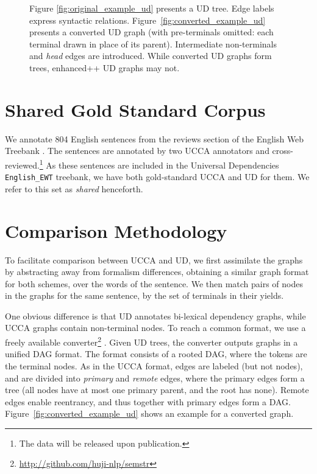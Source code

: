 \documentclass[11pt,a4paper]{article}
\begin{document}
\begin{figure}[!ht]
\caption{Figure \ref{fig:original_example_ud} presents a UD tree.
  Edge labels express syntactic relations.
Figure~\ref{fig:converted_example_ud} presents a converted UD graph
(with pre-terminals omitted: each terminal drawn in place of its parent).
Intermediate non-terminals and \textit{head} edges are introduced.
While converted UD graphs form trees, enhanced++ UD graphs may not.}\label{fig:ud_examples}
\end{figure}


\section{Shared Gold Standard Corpus}\label{sec:shared}

We annotate 804 English sentences from the reviews section of the English Web Treebank
\cite[EWT; ][]{bies2012english}.
The sentences are annotated by two UCCA annotators and
cross-reviewed.\footnote{The data will be released upon publication.}
As these sentences are included in the Universal Dependencies \texttt{English\_EWT} treebank,
we have both gold-standard UCCA and UD for them.
We refer to this set as \textit{shared} henceforth.


\section{Comparison Methodology}\label{sec:methodology}

To facilitate comparison between UCCA and UD,
we first assimilate the graphs by abstracting away from formalism differences,
obtaining a similar graph format for both schemes,
over the words of the sentence.
We then match pairs of nodes in the graphs for the same sentence,
by the set of terminals in their yields.

One obvious difference is that UD annotates bi-lexical dependency graphs,
while UCCA graphs contain non-terminal nodes.
To reach a common format, we use a freely available
converter\footnote{\url{http://github.com/huji-nlp/semstr}}
\cite{hershcovich2018multitask,hershcovich2018universal}.
Given UD trees, the converter outputs graphs in a unified DAG format.
The format consists of a rooted DAG, where the tokens are the terminal nodes.
As in the UCCA format, edges are labeled (but not nodes),
and are divided into \textit{primary} and \textit{remote} edges,
where the primary edges form a tree (all nodes have at most one primary parent,
and the root has none).
Remote edges enable reentrancy, and thus together with primary edges
form a DAG.
Figure~\ref{fig:converted_example_ud} shows an example for a converted graph.
\end{document}
